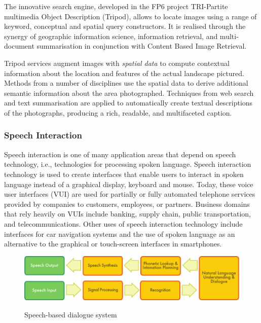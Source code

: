 \begin{multicols}{2}
The innovative search engine, developed in the FP6 project TRI-Partite multimedia Object Description (Tripod), allows to locate images using a range of keyword, conceptual and spatial query constructors.
It is realised through the synergy of geographic information science, information retrieval, and multi-document summarisation in conjunction with Content Based Image Retrieval.

Tripod services augment images with \textit{spatial data }to compute contextual information about the location and features of the actual landscape pictured.
Methods from a number of disciplines use the spatial data to derive additional semantic information about the area photographed.
Techniques from web search and text summarisation are applied to automatically create textual descriptions of the photographs, producing a rich, readable, and multifaceted caption.



\subsubsection{Speech Interaction}
Speech interaction is one of many application areas that depend on speech technology, i.e., technologies for processing spoken language.
Speech interaction technology is used to create interfaces that enable users to interact in spoken language instead of a graphical display, keyboard and mouse.
Today, these voice user interfaces (VUI) are used for partially or fully automated telephone services provided by companies to customers, employees, or partners.
Business domains that rely heavily on VUIs include banking, supply chain, public transportation, and telecommunications.
Other uses of speech interaction technology include interfaces for car navigation systems and the use of spoken language as an alternative to the graphical or touch-screen interfaces in smartphones.

\begin{figure}[htb]
  \center
  \includegraphics[width=\textwidth]{../_media/english/simple_speech-based_dialogue_architecture}
  \caption{Speech-based dialogue system}
   \label{fig:dialoguearch_en}
\end{figure}


\end{multicols}
